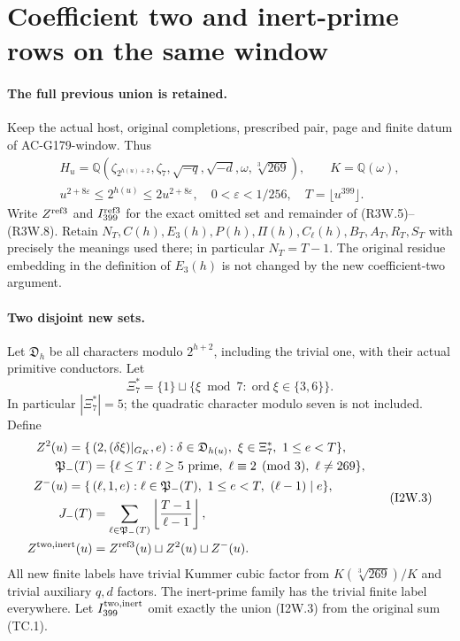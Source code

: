 \section{Coefficient two and inert-prime rows on the same window}
\label{sec:coefficient-two-inert-window}

\paragraph{The full previous union is retained.}
Keep the actual host, original completions, prescribed pair,
page and finite datum of AC-G179-window.  Thus
\[
 \begin{gathered}
 H_u=\mathbb Q(\zeta_{2^{h(u)+2}},\zeta_7,
       \sqrt{-q},\sqrt{-d},\omega,\sqrt[3]{269}),\qquad
 K=\mathbb Q(\omega),\\
 u^{2+8\varepsilon}\leq2^{h(u)}\leq2u^{2+8\varepsilon},\quad
 0<\varepsilon<1/256,\quad T=\lfloor u^{399}\rfloor.
 \end{gathered}\tag{I2W.1}
\]
Write $Z^{\rm ref3}$ and $I_{399}^{\rm ref3}$ for the exact
omitted set and remainder of (R3W.5)--(R3W.8).
Retain $N_T,C(h),E_3(h),P(h),\Pi(h),C_\ell(h),B_T,A_T,R_T,S_T$
with precisely the meanings used there; in particular $N_T=T-1$.
The original residue embedding in the definition of $E_3(h)$ is
not changed by the new coefficient-two argument.

\paragraph{Two disjoint new sets.}
Let $\mathfrak D_h$ be all characters modulo $2^{h+2}$,
including the trivial one, with their actual primitive conductors.
Let
\[
 \Xi_7^*=\{1\}\sqcup
       \{\xi\bmod7:\operatorname{ord}\xi\in\{3,6\}\}.
 \tag{I2W.2}
\]
In particular $|\Xi_7^*|=5$; the quadratic character modulo
seven is not included.  Define
\[
 \begin{aligned}
 Z^2(u)=\{\,&(2,(\delta\xi)|_{G_K},e):
        \delta\in\mathfrak D_{h(u)},\ \xi\in\Xi_7^*,\ 1\leq e<T\},\\
 \mathfrak P_-(T)&=\{\ell\leq T:\ell\geq5\text{ prime},\
                      \ell\equiv2\pmod3,\ \ell\ne269\},\\
 Z^-(u)=\{\,&(\ell,1,e):\ell\in\mathfrak P_-(T),\
                   1\leq e<T,\ (\ell-1)\mid e\},\\
 J_-(T)&=\sum_{\ell\in\mathfrak P_-(T)}
                             \left\lfloor\frac{T-1}{\ell-1}\right\rfloor,\\
 Z^{\rm two,inert}(u)&=Z^{\rm ref3}(u)\sqcup Z^2(u)\sqcup Z^-(u).
 \end{aligned}\tag{I2W.3}
\]
All new finite labels have trivial Kummer cubic factor from
$K(\sqrt[3]{269})/K$ and trivial auxiliary $q,d$ factors.
The inert-prime family has the trivial finite label everywhere.
Let $I_{399}^{\rm two,inert}$ omit exactly the union (I2W.3)
from the original sum (TC.1).

